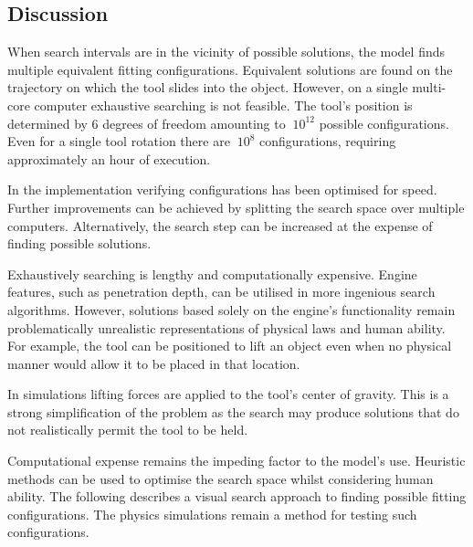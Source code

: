 \documentclass[11]{article}
\begin{document}
\subsection{Discussion}
When search intervals are in the vicinity of possible solutions, the model finds multiple equivalent fitting configurations.
Equivalent solutions are found on the trajectory on which the tool slides into the object.
However, on a single multi-core computer exhaustive searching is  not feasible. 
The tool's position is determined by 6 degrees of freedom amounting to $~10^{12}$ possible configurations. 
Even for a single tool rotation there are $~10^8$ configurations, requiring approximately an hour of execution. 

In the implementation verifying configurations has been optimised for speed.
Further improvements can be achieved by splitting the search space over multiple computers.
Alternatively, the search step can be increased at the expense of finding possible solutions. 

Exhaustively searching is lengthy and computationally expensive.
Engine features, such as penetration depth, can be utilised in more ingenious search algorithms.
However, solutions based solely on the engine's functionality remain problematically unrealistic representations of physical laws and human ability.
For example, the tool can be positioned to lift an object even when no physical manner would allow it to be placed in that location.  


In simulations lifting forces are applied to the tool's center of gravity.
This is a strong simplification of the problem as the search may produce solutions that do not realistically permit the tool to be held.

Computational expense remains the impeding factor to the model's use. 
Heuristic methods can be used to optimise the search space whilst considering human ability.
The following describes a visual search approach to finding possible fitting configurations. 
The physics simulations remain a method for testing such configurations. 

\end{document}
